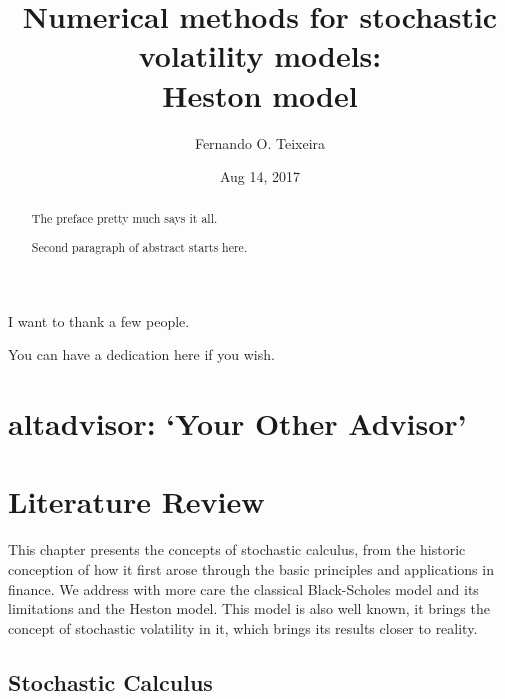 \documentclass[12pt,twoside]{reedthesis}
\title{\textbf{\Huge{Numerical methods for stochastic volatility models: \\[20pt] Heston model}}}
\author{Fernando O. Teixeira}
\date{Aug 14, 2017}
\theoremstyle{definition}
\theoremstyle{definition}
\theoremstyle{remark}
\begin{document}
      \maketitle
  
  \frontmatter %
  \pagestyle{empty} %
      \begin{acknowledgements}
      I want to thank a few people.
    \end{acknowledgements}
  
      \hypersetup{linkcolor=black}
    \setcounter{tocdepth}{2}
    \tableofcontents
  
      \listoftables
  
      \listoffigures
      \begin{abstract}
      The preface pretty much says it all. \par  Second paragraph of abstract
      starts here.
    \end{abstract}
      \begin{dedication}
      You can have a dedication here if you wish.
    \end{dedication}
  \mainmatter %
  \pagestyle{fancyplain} %

  \chapter{\texorpdfstring{altadvisor: `Your Other
  Advisor'}{altadvisor: Your Other Advisor}}\label{altadvisor-your-other-advisor}
  
  \chapter{Literature Review}\label{lt-review}
  
  This chapter presents the concepts of stochastic calculus, from the
  historic conception of how it first arose through the basic principles
  and applications in finance. We address with more care the classical
  Black-Scholes model and its limitations and the Heston model. This model
  is also well known, it brings the concept of stochastic volatility in
  it, which brings its results closer to reality.
  
  \section{Stochastic Calculus}\label{stochastic-calculus}
  
\end{document}

